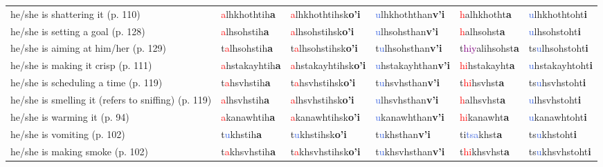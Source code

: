 \documentclass[oneside,openany]{book}%
\begin{document}
\begin{tabularx}{\textwidth}{>{\hsize=1.5\hsize\RaggedRight}X >{\hsize=0.9\hsize}X >{\hsize=0.9\hsize}X >{\hsize=0.9\hsize}X >{\hsize=0.9\hsize}X >{\hsize=0.9\hsize}X}
he/she is shattering it (p. 110)&\textcolor{Red}{a}lhkhothtih\textbf{a}&\textcolor{Red}{a}lhkhothtihsk\textbf{o'i}&\textcolor{RoyalBlue}{u}lhkhoththan\textbf{v'i}&\textcolor{Red}{h}alhkhotht\textbf{a}&\textcolor{RoyalBlue}{u}lhkhothtoht\textbf{i}\\%
he/she is setting a goal (p. 128)&\textcolor{Red}{a}lhsohstih\textbf{a}&\textcolor{Red}{a}lhsohstihsk\textbf{o'i}&\textcolor{RoyalBlue}{u}lhsohsthan\textbf{v'i}&\textcolor{Red}{h}alhsohst\textbf{a}&\textcolor{RoyalBlue}{u}lhsohstoht\textbf{i}\\%
he/she is aiming at him/her (p. 129)&t\textcolor{Red}{a}lhsohstih\textbf{a}&t\textcolor{Red}{a}lhsohstihsk\textbf{o'i}&t\textcolor{RoyalBlue}{u}lhsohsthan\textbf{v'i}&t\textcolor{Purple}{hiy}alihsohst\textbf{a}&ts\textcolor{RoyalBlue}{u}lhsohstoht\textbf{i}\\%
he/she is making it crisp (p. 111)&\textcolor{Red}{a}hstakayhtih\textbf{a}&\textcolor{Red}{a}hstakayhtihsk\textbf{o'i}&\textcolor{RoyalBlue}{u}hstakayhthan\textbf{v'i}&\textcolor{Red}{hi}hstakayht\textbf{a}&\textcolor{RoyalBlue}{u}hstakayhtoht\textbf{i}\\%
he/she is scheduling a time (p. 119)&t\textcolor{Red}{a}hsvhstih\textbf{a}&t\textcolor{Red}{a}hsvhstihsk\textbf{o'i}&t\textcolor{RoyalBlue}{u}hsvhsthan\textbf{v'i}&t\textcolor{Red}{hi}hsvhst\textbf{a}&ts\textcolor{RoyalBlue}{u}hsvhstoht\textbf{i}\\%
he/she is smelling it (refers to sniffing) (p. 119)&\textcolor{Red}{a}lhsvhstih\textbf{a}&\textcolor{Red}{a}lhsvhstihsk\textbf{o'i}&\textcolor{RoyalBlue}{u}lhsvhsthan\textbf{v'i}&\textcolor{Red}{h}alhsvhst\textbf{a}&\textcolor{RoyalBlue}{u}lhsvhstoht\textbf{i}\\%
he/she is warming it (p. 94)&\textcolor{Red}{a}kanawhtih\textbf{a}&\textcolor{Red}{a}kanawhtihsk\textbf{o'i}&\textcolor{RoyalBlue}{u}kanawhthan\textbf{v'i}&\textcolor{Red}{hi}kanawht\textbf{a}&\textcolor{RoyalBlue}{u}kanawhtoht\textbf{i}\\%
he/she is vomiting (p. 102)&t\textcolor{RoyalBlue}{u}khstih\textbf{a}&t\textcolor{RoyalBlue}{u}khstihsk\textbf{o'i}&t\textcolor{RoyalBlue}{u}khsthan\textbf{v'i}&ti\textcolor{RoyalBlue}{tsa}khst\textbf{a}&ts\textcolor{RoyalBlue}{u}khstoht\textbf{i}\\%
he/she is making smoke (p. 102)&t\textcolor{Red}{a}khsvhstih\textbf{a}&t\textcolor{Red}{a}khsvhstihsk\textbf{o'i}&t\textcolor{RoyalBlue}{u}khsvhsthan\textbf{v'i}&t\textcolor{Red}{hi}khsvhst\textbf{a}&ts\textcolor{RoyalBlue}{u}khsvhstoht\textbf{i}\\%

\end{tabularx}
\end{document}
